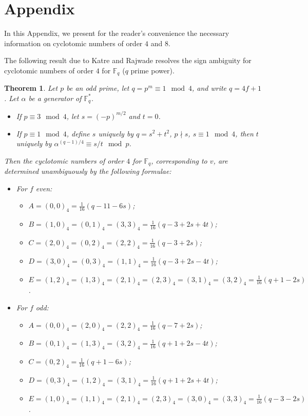 \documentclass[12pt, a4paper]{article}
\newtheorem{theorem}{Theorem}[section]
\theoremstyle{definition}
\begin{document}
\section*{Appendix}
In this Appendix, we present for the reader's convenience the necessary information on cyclotomic numbers of order $4$ and $8$.

The following result due to Katre and Rajwade \cite{KatRaj} resolves the sign ambiguity for cyclotomic numbers of order $4$ for $\mathbb{F}_q$ ($q$ prime power).

\begin{theorem}\label{thm:KaRaThm}
Let $p$ be an odd prime, let $q=p^m \equiv 1 \mod 4$, and write $q=4f+1$.  Let $\alpha$ be a generator of $\mathbb{F}_q^*$. 
\begin{itemize}
    \item If $p \equiv 3 \mod 4$, let $s=(-p)^{m/2}$ and $t=0$.
    \item If $p \equiv 1 \mod 4$, define $s$ uniquely by $q=s^2+t^2$, $p \nmid s$, $s \equiv 1 \mod 4$, then $t$ uniquely by $\alpha^{(q-1)/4} \equiv s/t \mod p$.
\end{itemize}
Then the cyclotomic numbers of order $4$ for $\mathbb{F}_q$, corresponding to $v$, are determined unambiguously by the following formulae:
\begin{itemize}
    \item For $f$ even: 
    \begin{itemize}
        \item $A=(0,0)_4=\frac{1}{16}(q-11-6s)$;
        \item $B=(1,0)_4=(0,1)_4=(3,3)_4=\frac{1}{16}(q-3+2s+4t)$;
        \item $C=(2,0)_4=(0,2)_4=(2,2)_4=\frac{1}{16}(q-3+2s)$; 
        \item $D=(3,0)_4=(0,3)_4=(1,1)_4=\frac{1}{16}(q-3+2s-4t)$; 
        \item $E=(1,2)_4=(1,3)_4=(2,1)_4=(2,3)_4=(3,1)_4=(3,2)_4=\frac{1}{16}(q+1-2s)$.
    \end{itemize}
    \item For $f$ odd: 
    \begin{itemize}
        \item $A=(0,0)_4=(2,0)_4=(2,2)_4=\frac{1}{16}(q-7+2s)$; 
        \item $B=(0,1)_4=(1,3)_4=(3,2)_4=\frac{1}{16}(q+1+2s-4t)$;
        \item $C=(0,2)_4=\frac{1}{16}(q+1-6s)$;
        \item $D=(0,3)_4=(1,2)_4=(3,1)_4=\frac{1}{16}(q+1+2s+4t)$;
        \item $E=(1,0)_4=(1,1)_4=(2,1)_4=(2,3)_4=(3,0)_4=(3,3)_4=\frac{1}{16}(q-3-2s)$.
    \end{itemize}
\end{itemize}
\end{theorem}
\end{document}
